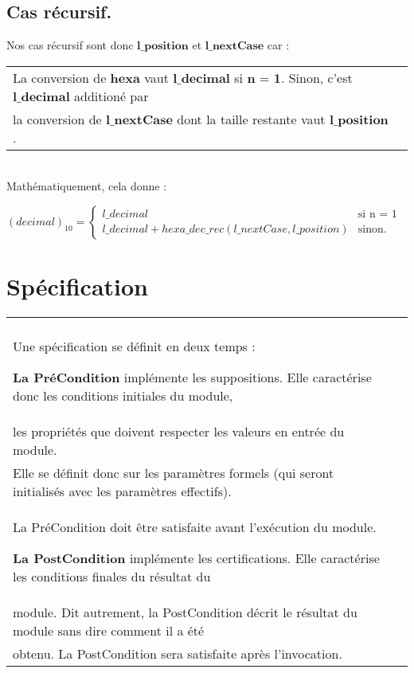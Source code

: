 \documentclass[a4paper, 11pt, oneside]{article}
\begin{document}
	\subsection{Cas récursif.}\label{cas_recur}
	
		Nos cas récursif sont donc $\textbf{l\_position}$ et $\textbf{l\_nextCase}$ car :
		\\
		
		\begin{tabular}{|p{15cm}|c}
			\hline
			La conversion de $\textbf{hexa}$ vaut $\textbf{l\_decimal}$ si $\textbf{n = 1}$. Sinon, c'est $\textbf{l\_decimal}$ additioné par 
			\\ la conversion de $\textbf{l\_nextCase}$ dont la taille restante vaut $\textbf{l\_position}$.
			\\
			\hline
		\end{tabular}
		\\
		
		Mathématiquement, cela donne :
		
		$
		(decimal)_{10} = \left\{
    	\begin{array}{ll}
        		l\_decimal & \mbox{si n = 1}  \\
        		l\_decimal + hexa\_dec\_rec(l\_nextCase, l\_position) & \mbox{sinon.}
    	\end{array}
		\right.
		$
		

\section{Spécification}\label{specification}

		\begin{tabular}{|p{17cm}|c}
			\hline
			\\
			Une spécification se définit en deux temps :
			\vspace{3mm}
		
			\textbf{La PréCondition}  implémente les suppositions. Elle caractérise donc les conditions initiales du module,
			\\ les propriétés que doivent respecter les valeurs en entrée du module.
			\\ Elle se définit donc sur les paramètres formels (qui seront initialisés avec les paramètres effectifs). 
			\\ La PréCondition doit être satisfaite avant l’exécution du module.
			
			\vspace{3mm}
			
			\textbf{La PostCondition} implémente les certifications. Elle caractérise les conditions finales du résultat du
			\\ module. Dit autrement, la PostCondition décrit le résultat du module sans dire comment il a été 
			\\ obtenu. La PostCondition sera satisfaite après l’invocation.

			\\
			\hline
		\end{tabular}
		
\end{document}
